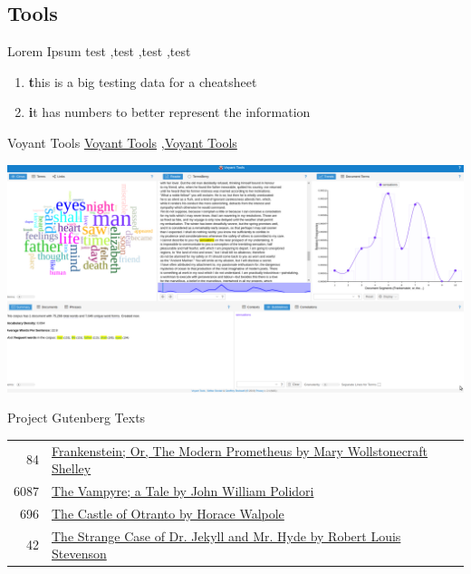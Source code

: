 \documentclass[10pt,a4paper]{article}
\begin{document}
\begin{multicols}{3}
\section{Tools}



\begin{textbox}{Lorem Ipsum}
test  \sep test \sep test \sep test

\bigskip

\begin{enumerate}
\item \textbf this is a {big} testing data for a cheatsheet 
\item \textbf it has {numbers} to better represent the information
\end{enumerate}

\end{textbox}


\begin{textbox}{Voyant Tools}
 \href{https://voyant-tools.org/}{Voyant Tools} \sep \href{https://voyant-tools.org/}{Voyant Tools}

\includegraphics[width=\textwidth]{voyant.png}
\end{textbox}




\begin{textbox}{Project Gutenberg Texts}
\begin{tabular}{r|p{}}\scriptsize
    84 & \href{http://www.gutenberg.org/ebooks/84}{Frankenstein; Or, The Modern Prometheus by Mary Wollstonecraft Shelley} \\
    6087 & \href{https://www.gutenberg.org/ebooks/6087}{The Vampyre; a Tale by John William Polidori} \\
    696 & \href{https://www.gutenberg.org/ebooks/696}{The Castle of Otranto by Horace Walpole} \\
    42 & \href{https://www.gutenberg.org/ebooks/42}{The Strange Case of Dr. Jekyll and Mr. Hyde by Robert Louis Stevenson}
\end{tabular}


\end{textbox}
\end{multicols}
\end{document}
